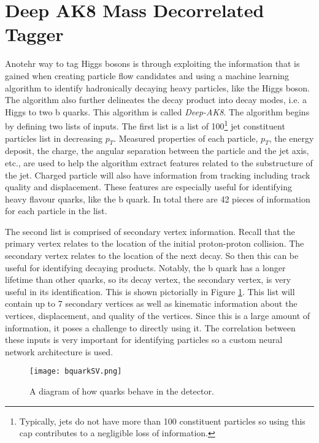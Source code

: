 \section{Deep AK8 Mass Decorrelated Tagger}

Anotehr way to tag Higgs bosons is through exploiting the information that is gained when creating particle flow candidates and using a machine learning algorithm to identify hadronically decaying heavy particles, like the Higgs boson.
The algorithm also further delineates the decay product into decay modes, i.e. a Higgs to two b quarks. This algorithm is called \textit{Deep-AK8}.
The algorithm begins by defining two lists of inputs. The first list is a list of 100\footnote{Typically, jets do not have more than 100 constituent particles so using this cap contributes to a negligible loss of information.} jet constituent particles list in decreasing $p_T$.
Measured properties of each particle, $p_T$, the energy deposit, the charge, the angular separation between the particle and the
jet axis, etc., are used to help the algorithm extract features related to the substructure of the jet.
Charged particle will also have information from tracking including track quality and displacement.
These features are especially useful for identifying heavy flavour quarks, like the b quark. In total there are 42 pieces of information for each particle in the list.

The second list is comprised of secondary vertex information. Recall that the primary vertex relates to the location of the initial proton-proton collision.
The secondary vertex relates to the location of the next decay. So then this can be useful for identifying decaying products.
Notably, the b quark has a longer lifetime than other quarks, so its decay vertex, the secondary vertex, is very useful in its identification. This is shown pictorially in Figure \ref{fig:fig_4-1}.
This list will contain up to 7 secondary vertices as well as kinematic information about the vertices, displacement, and quality of the vertices.
Since this is a large amount of information, it poses a challenge to directly using it. The correlation between these inputs is very important for identifying particles so a custom neural network architecture is used.

\begin{figure} %
    \centering
    \texttt{[image: bquarkSV.png]}
    \caption{A diagram of how quarks behave in the detector.}
    \label{fig:fig_4-1}
 \end{figure}
